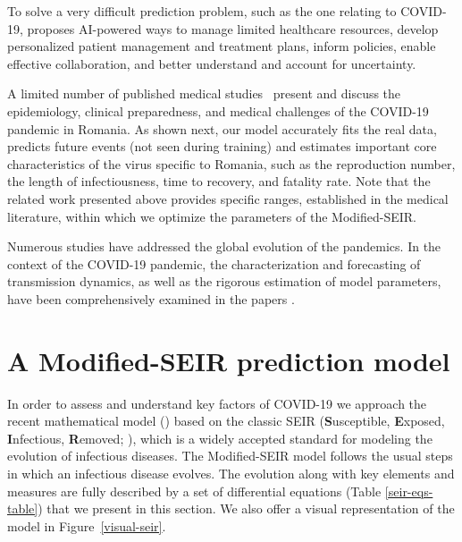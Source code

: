 \documentclass[11pt]{article}
\begin{document}
To solve a very difficult prediction problem, such as the one relating to COVID-19, \cite{how-artificial} proposes AI-powered ways to manage limited healthcare resources, develop personalized patient management and treatment plans, inform policies, enable effective collaboration, and better understand and account for uncertainty.

A limited number of published medical studies~\cite{popescu2020covid, gherghel2020romania} present and discuss the epidemiology, clinical preparedness, and medical challenges of the COVID-19 pandemic in Romania. As shown next, our model accurately fits the real data, predicts future events (not seen during training) and estimates important core characteristics of the virus specific to Romania, such as the reproduction number, the length of infectiousness, time to recovery, and fatality rate. Note that the related work presented above provides specific ranges, established in the medical literature, within which we optimize the parameters of the Modified-SEIR.

Numerous studies have addressed the global evolution of the pandemics. In the context of the COVID-19 pandemic, the characterization and forecasting of transmission dynamics, as well as the rigorous estimation of model parameters, have been comprehensively examined in the papers \cite{Krivorotko, MASSONIS2021441, Ciupe, Long03082021, petrica2022regime, MARINOV2020100041, Sikder}.

\section{A Modified-SEIR prediction model}\label{model}

In order to assess and understand key factors of COVID-19 we approach the recent 
mathematical model (\cite{chowdhury2020dynamic}) based on the classic SEIR (\textbf{S}usceptible, \textbf{E}xposed, \textbf{I}nfectious, \textbf{R}emoved; \cite{doi:10.1137/S0036144500371907}), which is a widely accepted standard for modeling the evolution of infectious diseases. The Modified-SEIR model follows the usual steps in which an infectious disease evolves. The evolution along with key elements and measures are fully described by a set of differential equations (Table \ref{seir-eqs-table})
that we present in this section. We also offer a visual representation of the model in Figure~\ref{visual-seir}.

\newpage
\end{document}
